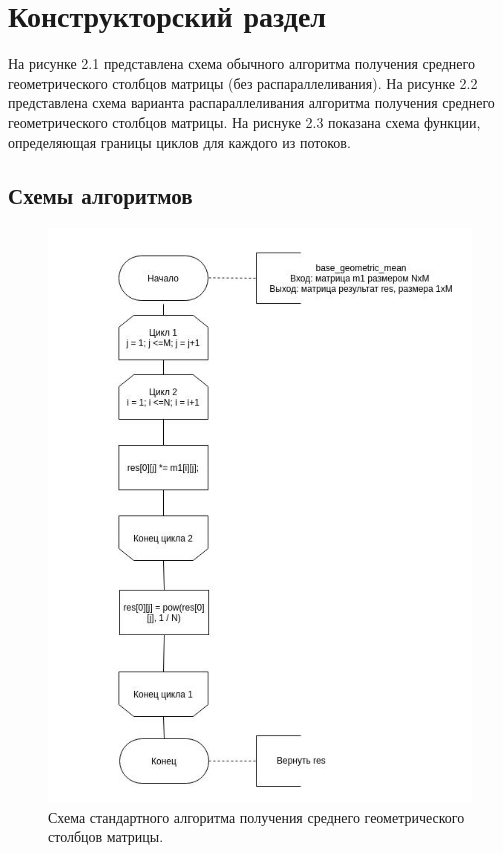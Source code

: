 \chapter{Конструкторский раздел}
\label{cha:design}
    На рисунке 2.1 представлена схема обычного алгоритма получения среднего геометрического столбцов матрицы (без распараллеливания). На рисунке 2.2 представлена схема варианта распараллеливания алгоритма получения среднего геометрического столбцов матрицы. На риснуке 2.3 показана схема функции, определяющая границы циклов для каждого из потоков.

    \section{Схемы алгоритмов}
    
    
    \begin{figure}[h]
    	\centering
    	\includegraphics[scale=0.93]{base.jpg}
    	\caption{Схема стандартного алгоритма получения среднего геометрического столбцов матрицы.}
    	\label{fig:mpr}
    \end{figure}
    
